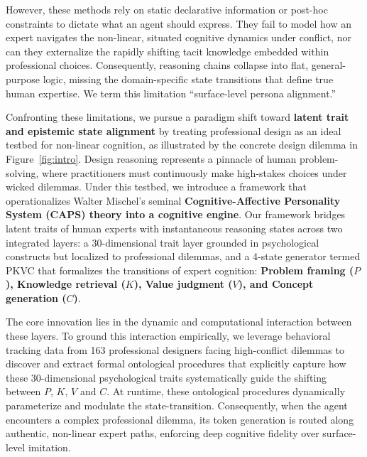 \documentclass[11pt]{article}
\begin{document}
However, these methods rely on static declarative information or post-hoc constraints to dictate what an agent should express. They fail to model how an expert navigates the non-linear, situated cognitive dynamics under conflict, nor can they externalize the rapidly shifting tacit knowledge embedded within professional choices. Consequently, reasoning chains \cite{zhang2025igniting} collapse into flat, general-purpose logic, missing the domain-specific state transitions that define true human expertise. We term this limitation ``surface-level persona alignment.''

Confronting these limitations, we pursue a paradigm shift toward \textbf{latent trait and epistemic state alignment} by treating professional design as an ideal testbed for non-linear cognition, as illustrated by the concrete design dilemma in Figure~\ref{fig:intro}. Design reasoning represents a pinnacle of human problem-solving, where practitioners must continuously make high-stakes choices under wicked dilemmas. Under this testbed, we introduce a framework that operationalizes Walter Mischel’s seminal \textbf{Cognitive-Affective Personality System (CAPS) theory \cite{mischel1995cognitive} into a cognitive engine}. Our framework bridges latent traits of human experts with instantaneous reasoning states across two integrated layers: a 30-dimensional trait layer grounded in psychological constructs but localized to professional dilemmas, and a 4-state generator termed PKVC that formalizes the transitions of expert cognition: \textbf{Problem framing ($P$), Knowledge retrieval ($K$), Value judgment ($V$), and Concept generation ($C$)}.

The core innovation lies in the dynamic and computational interaction between these layers. To ground this interaction empirically, we leverage behavioral tracking data from 163 professional designers facing high-conflict dilemmas to discover and extract formal ontological procedures that explicitly capture how these 30-dimensional psychological traits systematically guide the shifting between $P$, $K$, $V$ and $C$. At runtime, these ontological procedures dynamically parameterize and modulate the state-transition. Consequently, when the agent encounters a complex professional dilemma, its token generation is routed along authentic, non-linear expert paths, enforcing deep cognitive fidelity over surface-level imitation. 
\end{document}
